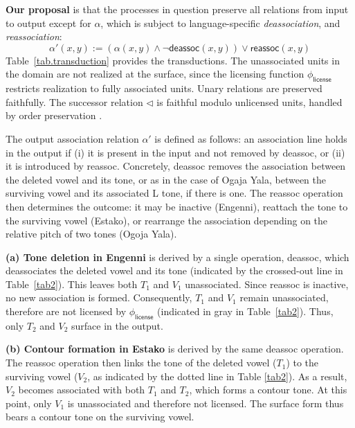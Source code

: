 \documentclass{article}[12pt]
\begin{document}
\textbf{Our proposal} is that the processes in question preserve all relations from input to output except 
for $\alpha$, which is subject to language-specific 
\textit{deassociation}, and 
\textit{reassociation}:
\[
\alpha'(x,y) := (\alpha(x,y)\land \neg \textsf{deassoc}(x,y)) \lor \textsf{reassoc}(x,y)
\]
Table~\ref{tab.transduction} provides the transductions.
The unassociated units in the domain are not realized at the surface,
since the licensing function $\phi_{\textsf{license}}$ restricts
realization to fully associated units.
Unary relations are preserved faithfully.
The successor relation $\lhd$ is faithful modulo unlicensed units,
handled by order preservation \citep{bhaskar+2023}.

  

The output association relation $\alpha'$ is defined
as follows: 
an association line holds in the output if (i) it is present 
in the input and not removed by \textsf{deassoc}, or (ii) it is 
introduced by \textsf{reassoc}. Concretely, \textsf{deassoc} 
removes the association between the deleted vowel and its tone, or as in the case of 
Ogaja Yala, between the surviving vowel
and its associated L tone, if 
there is one.
The \textsf{reassoc} operation then determines 
the outcome: it may be inactive (Engenni), reattach the tone to 
the surviving vowel (Estako), or rearrange the association depending
on the relative pitch of two tones (Ogoja Yala).

 \textbf{(a) Tone deletion in Engenni} is derived
by a single operation, \textsf{deassoc}, which deassociates the
deleted vowel and its tone (indicated by the crossed-out line in
Table~\ref{tab2}).  This leaves both $T_1$ and $V_1$
unassociated. Since \textsf{reassoc} is inactive, no new association
is formed. Consequently, $T_1$ and $V_1$ remain unassociated,
therefore are not licensed by $\phi_{\textsf{license}}$ (indicated in
gray in Table~\ref{tab2}). Thus, only $T_2$ and $V_2$ surface in the
output.

\textbf{(b) Contour formation in Estako} is derived by the same 
\textsf{deassoc} operation. The \textsf{reassoc} operation then 
links the tone of the deleted vowel ($T_1$) to the surviving 
vowel ($V_2$, as indicated by the dotted line in Table \ref{tab2}). 
As a result, $V_2$ becomes associated with both $T_1$ and $T_2$, 
which forms a contour tone. At this point, only $V_1$ is unassociated 
and therefore not licensed. The surface form thus bears a contour 
tone on the surviving vowel.
\end{document}
